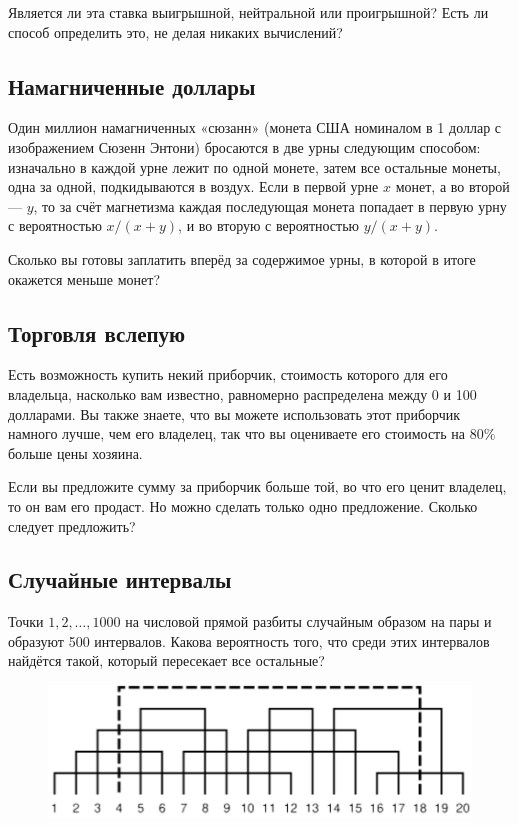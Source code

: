 \medskip

Является ли эта ставка выигрышной, нейтральной или проигрышной? Есть ли способ определить это, не делая никаких вычислений?

\subsection*{Намагниченные доллары}%

Один миллион намагниченных «сюзанн» (монета США номиналом в 1 доллар с изображением Сюзенн Энтони) бросаются в две урны следующим способом: изначально в каждой урне лежит по одной монете, затем все остальные монеты, одна за одной, подкидываются в воздух.
Если в первой урне $x$ монет, а во второй --- $y$, то за счёт магнетизма каждая последующая монета попадает в первую урну с вероятностью $x/(x+y)$, и во вторую с вероятностью $y/(x+y)$.

Сколько вы готовы заплатить вперёд за содержимое урны, в которой в итоге окажется меньше монет?

\subsection*{Торговля вслепую}%

Есть возможность купить некий приборчик, стоимость которого для его владельца, насколько вам известно, равномерно распределена между 0 и 100 долларами.
Вы также знаете, что вы можете использовать этот приборчик намного лучше, чем его владелец, так что вы оцениваете его стоимость на $80\%$ больше цены хозяина.

\medskip

Если вы предложите сумму за приборчик больше той, во что его ценит владелец, то он вам его продаст.
Но можно сделать только одно предложение.
Сколько следует предложить?

\subsection*{Случайные интервалы}%

Точки $1, 2,\dots, 1000$ на числовой прямой разбиты случайным образом на пары и образуют 500 интервалов.
Какова вероятность того, что среди этих интервалов найдётся такой, который пересекает все остальные?

\begin{figure}[h!]
\centering
\includegraphics[scale=0.8]{Figs/Probability/ints}
\end{figure}
